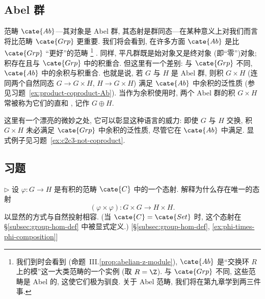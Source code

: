 \subsection{Abel 群}
\label{subsec:abelian-groups}

范畴 $\cate{Ab}$---其对象是 Abel 群, 其态射是群同态---在某种意义上对我们而言将比范畴 $\cate{Grp}$ 更重要. 我们将会看到, 在许多方面 $\cate{Ab}$ 是比 $\cate{Grp}$ ``更好''的范畴%
\footnote{我们到时会看到 (命题~III.\ref{prop:abelian-z-module}), $\cate{Ab}$ 是``交换环 $R$ 上的模''这一大类范畴的一个实例 (取 $R = \Z$). 与 $\cate{Grp}$ 不同, 这些范畴是 Abel 的, 这使它们极为驯良. 关于 Abel 范畴, 我们将在第九章学到两三件事.}%
. 同样, 平凡群既是始对象又是终对象 (即``零'')对象; 积存在且与 $\cate{Grp}$ 中的积重合. 但这里有一个差别: 与 $\cate{Grp}$ 不同, $\cate{Ab}$ 中的余积与积重合. 也就是说, 若 $G$ 与 $H$ 是 Abel 群, 则积 $G \times H$ (连同两个自然同态 $G \to G \times H$, $H \to G \times H$) 满足 $\cate{Ab}$ 中余积的泛性质 (参见习题~\ref{ex:product-coproduct-Ab}). 当作为余积使用时, 两个 Abel 群的积 $G \times H$ 常被称为它们的直和%
, 记作 $G \oplus H$.

这里有一个漂亮的微妙之处, 它可以彰显这种语言的威力: 即使 $G$ 与 $H$ 交换, 积 $G \times H$ 未必满足 $\cate{Grp}$ 中余积的泛性质, 尽管它在 $\cate{Ab}$ 中满足. 显式例子见习题~\ref{ex:c2c3-not-coproduct}.

\subsection*{习题}
{}

\begin{prob}
\label{ex:phi-times-phi}
$\triangleright$ 设 $\varphi : G \to H$ 是有积的范畴 $\cate{C}$ 中的一个态射. 解释为什么存在唯一的态射
\[
(\varphi \times \varphi) : G \times G \to H \times H.
\]
以显然的方式与自然投射相容.
(当 $\cate{C} = \cate{Set}$ 时, 这个态射在 \S\ref{subsec:group-hom-def} 中被显式定义.) [\S\ref{subsec:group-hom-def}, \ref{ex:phi-times-phi-composition}]
\end{prob}

